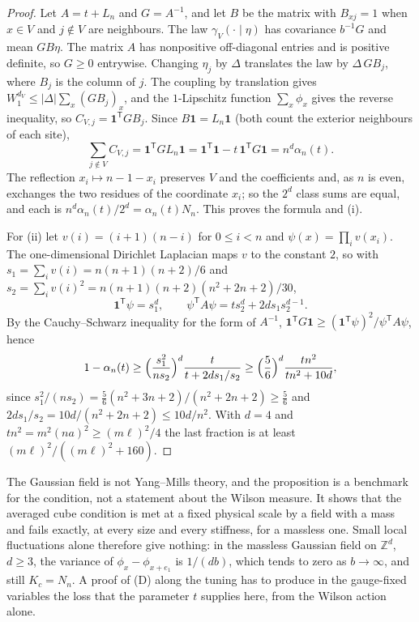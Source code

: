\documentclass[aps,prd,twocolumn,superscriptaddress,nofootinbib,longbibliography,floatfix,amsmath,amssymb,10pt]{revtex4-2}
\theoremstyle{definition}
\theoremstyle{remark}
\newcommand{\Z}{\mathbb{Z}}
\begin{document}
\begin{proof}
Let $A=t+L_n$ and $G=A^{-1}$, and let $B$ be the matrix with $B_{xj}=1$ when
$x\in V$ and $j\notin V$ are neighbours. The law $\gamma_V(\cdot\mid\eta)$ has
covariance $b^{-1}G$ and mean $GB\eta$. The matrix $A$ has nonpositive
off-diagonal entries and is positive definite, so $G\ge0$ entrywise. Changing
$\eta_j$ by $\Delta$ translates the law by $\Delta\,GB_j$, where $B_j$ is the
column of $j$. The coupling by translation gives $W_1^{d_V}\le|\Delta|
\sum_x(GB_j)_x$, and the $1$-Lipschitz function $\sum_x\phi_x$ gives the
reverse inequality, so $C_{V,j}=\mathbf1^{\mathsf T}GB_j$. Since
$B\mathbf1=L_n\mathbf1$ (both count the exterior neighbours of each site),
\[
\sum_{j\notin V}C_{V,j}=\mathbf1^{\mathsf T}GL_n\mathbf1
=\mathbf1^{\mathsf T}\mathbf1-t\,\mathbf1^{\mathsf T}G\mathbf1
=n^d\alpha_n(t).
\]
The reflection $x_i\mapsto n-1-x_i$ preserves $V$ and the coefficients and,
as $n$ is even, exchanges the two residues of the coordinate $x_i$; so the
$2^d$ class sums are equal, and each is $n^d\alpha_n(t)/2^d=\alpha_n(t)N_n$.
This proves the formula and (i).

For (ii) let $v(i)=(i+1)(n-i)$ for $0\le i<n$ and $\psi(x)=\prod_iv(x_i)$.
The one-dimensional Dirichlet Laplacian maps $v$ to the constant $2$, so with
$s_1=\sum_iv(i)=n(n+1)(n+2)/6$ and $s_2=\sum_iv(i)^2=n(n+1)(n+2)(n^2+2n+2)/30$,
\[
\mathbf1^{\mathsf T}\psi=s_1^d,\qquad
\psi^{\mathsf T}A\psi=ts_2^d+2ds_1s_2^{d-1}.
\]
By the Cauchy--Schwarz inequality for the form of $A^{-1}$,
$\mathbf1^{\mathsf T}G\mathbf1\ge(\mathbf1^{\mathsf T}\psi)^2/\psi^{\mathsf T}
A\psi$, hence
\[
1-\alpha_n(t)\ge\Bigl(\frac{s_1^2}{ns_2}\Bigr)^d\frac t{t+2ds_1/s_2}
\ge\Bigl(\frac56\Bigr)^d\frac{tn^2}{tn^2+10d},
\]
since $s_1^2/(ns_2)=\frac56(n^2+3n+2)/(n^2+2n+2)\ge\frac56$ and
$2ds_1/s_2=10d/(n^2+2n+2)\le10d/n^2$. With $d=4$ and $tn^2=m^2(na)^2\ge
(m\ell)^2/4$ the last fraction is at least $(m\ell)^2/((m\ell)^2+160)$.
\end{proof}

The Gaussian field is not Yang--Mills theory, and the proposition is a
benchmark for the condition, not a statement about the Wilson measure. It
shows that the averaged cube condition is met at a fixed physical scale by a
field with a mass and fails exactly, at every size and every stiffness, for
a massless one. Small local fluctuations alone therefore give nothing: in the
massless Gaussian field on $\Z^d$, $d\ge3$, the variance of
$\phi_x-\phi_{x+e_1}$ is $1/(db)$,
which tends to zero as $b\to\infty$, and still $K_c=N_n$. A proof of (D)
along the tuning has to produce in the gauge-fixed variables the loss that
the parameter $t$ supplies here, from the Wilson action alone.
\end{document}

